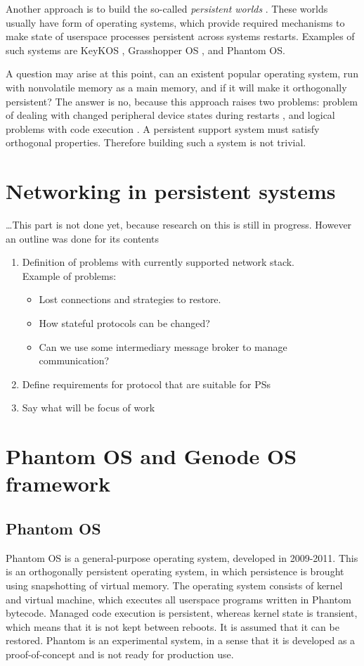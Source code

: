 Another approach is to build the so-called \textit{persistent worlds} 
\cite{atkinson1995orthogonally}. These worlds usually have form of 
operating systems, which provide required mechanisms to make state of   
userspace processes persistent across systems restarts. 
Examples of such systems are KeyKOS \cite{bomberger1992keykos}, Grasshopper OS
\cite{dearle1994grasshopper}, and Phantom OS.

A question may arise at this point, can an existent popular operating system, 
run with nonvolatile memory as a main memory, and if it will make it 
orthogonally persistent?
The answer is no, because this approach raises two problems: problem of dealing
with changed peripheral device states during restarts 
\cite{berthou2018peripheral}, and logical problems with code execution 
\cite{ransford2014nonvolatile}. A persistent support system must satisfy 
orthogonal properties. Therefore building such a system is not trivial.

\section{Networking in persistent systems}
\dots This part is not done yet, because research on this is still in progress.
However an outline was done for its contents
\begin{enumerate}
    \item Definition of problems with currently supported network stack. \\
    Example of problems:
    \begin{itemize}
        \item Lost connections and strategies to restore. 
        \item How stateful protocols can be changed? 
        \item Can we use some intermediary message broker to manage 
        communication?
    \end{itemize} 
    \item Define requirements for protocol that are suitable for PSs
    \item Say what will be focus of work
\end{enumerate} 

\section{Phantom OS and Genode OS framework}
\subsection{Phantom OS}
Phantom OS is a general-purpose operating system, developed in 2009-2011. This 
is an orthogonally persistent operating system, in which persistence is brought
using snapshotting of virtual memory. The operating system consists of kernel 
and virtual machine, which executes all userspace programs written in Phantom 
bytecode. Managed code execution is persistent, whereas kernel state is 
transient, which means that it is not kept between reboots. It is assumed that 
it can be restored. 
Phantom is an experimental system, in a sense that it is developed as a 
proof-of-concept and is not ready for production use.

